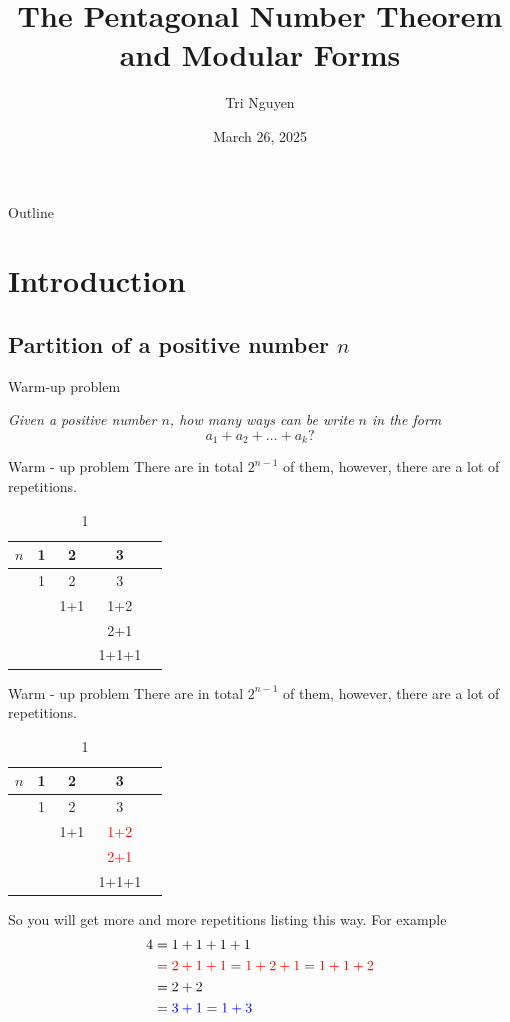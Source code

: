 \documentclass[pdf]{beamer}
\title{The Pentagonal Number Theorem and Modular Forms}
\author{Tri Nguyen}
\date{March 26, 2025}
\begin{document}
\begin{frame}
  \titlepage
\end{frame}

\begin{frame}{Outline}
  \tableofcontents
\end{frame}

\section{Introduction}
\subsection{Partition of a positive number $n$}
\begin{frame}{Warm-up problem}
\begin{center}
    \textit{Given a positive number $n$, how many ways can be write $n$ in the form }
    \[a_1+a_2+\ldots+a_k?\]
\end{center}
\end{frame}
\begin{frame}{Warm - up problem}
There are in total $2^{n-1}$ of them, however, there are a lot of repetitions. 
\begin{table}
\begin{tabular}{l  c  c  c  c }
$n$ & 1 & 2 & 3  \\
\hline\pause
 & 1 & 2 & 3  \\ 
 &  & 1+1 & 1+2\\
 &  &  & 2+1 \\
 &  & & 1+1+1
\end{tabular}
\caption{1 }
\end{table}

\end{frame}
\begin{frame}{Warm - up problem}
There are in total $2^{n-1}$ of them, however, there are a lot of repetitions. 
\begin{table}
\begin{tabular}{l  c  c  c  c }
$n$ & 1 & 2 & 3  \\
\hline\pause
 & 1 & 2 & 3  \\ 
 &  & 1+1 & \textcolor{red}{1+2}\\
 &  &  & \textcolor{red}{2+1} \\
 &  & & 1+1+1
\end{tabular}
\caption{1 }
\end{table}\pause
So you will get more and more repetitions listing this way. For example
\begin{align*}
    4 &= 1+1+1+1\\ &= \textcolor{red}{2+1+1} = \textcolor{red}{1+2+1}=\textcolor{red}{1+1+2}\\ 
    &=2+2\\
    &=\textcolor{blue}{3+1}=\textcolor{blue}{1+3}
\end{align*}
\end{frame}
\end{document}
